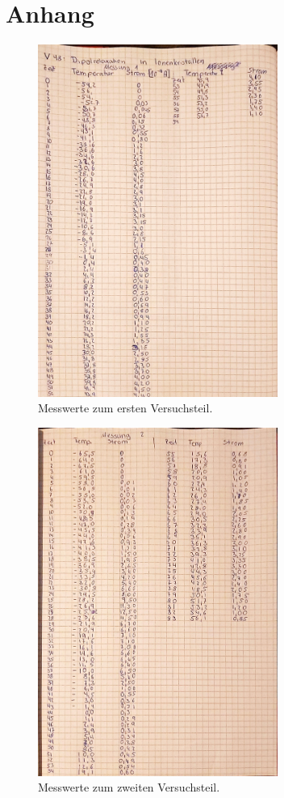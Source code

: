 \section{Anhang}\label{sec:Anhang}
\begin{figure}[h]
    \centering
    \includegraphics[width=0.7\textwidth]{Abbildungen/Messung1.pdf}
    \caption {Messwerte zum ersten Versuchsteil.}
\end{figure}
\begin{figure}[h]
    \centering
    \includegraphics[width=0.7\textwidth]{Abbildungen/Messung2.pdf}
    \caption {Messwerte zum zweiten Versuchsteil.}
\end{figure}
\pagebreak